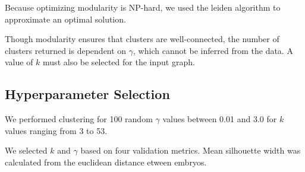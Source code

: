 \documentclass{article}
\begin{document}
Because optimizing modularity is NP-hard, we used the leiden algorithm to approximate an optimal solution\cite{traag2019louvain}.

Though modularity ensures that clusters are well-connected, the number of clusters returned is dependent on $\gamma$, which cannot be inferred from the data. A value of $k$ must also be selected for the input graph.

\subsection{Hyperparameter Selection}

We performed clustering for 100 random $\gamma$ values between 0.01 and 3.0 for $k$ values ranging from 3 to 53.

We selected $k$ and $\gamma$ based on four validation metrics. Mean silhouette width was calculated from the euclidean distance etween embryos.
\end{document}
